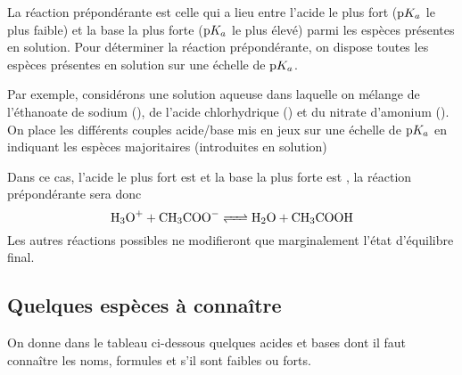 \documentclass{cours}
\begin{document}
La réaction prépondérante est celle qui a lieu entre l'acide le plus fort ($\mathrm{p}K_a$ le plus faible) et la base la plus forte ($\mathrm{p}K_a$  le plus élevé) parmi les espèces présentes en solution. Pour déterminer la réaction prépondérante, on dispose toutes les espèces présentes en solution sur une échelle de $\mathrm{p}K_a$. 

Par exemple, considérons une solution aqueuse dans laquelle on mélange de l'éthanoate de sodium (), de l'acide chlorhydrique () et du nitrate d'amonium (). On place les différents couples acide/base mis en jeux sur une échelle de $\mathrm{p}K_a$ en indiquant les espèces majoritaires (introduites en solution)
\begin{center}
\end{center}

Dans ce cas, l'acide le plus fort est  et la base la plus forte est , la réaction prépondérante sera donc
\begin{equation}
  \ce{H3O+ + CH3COO- <=> H2O + CH3COOH}
\end{equation}
Les autres réactions possibles ne modifieront que marginalement l'état d'équilibre final.
\subsection{Quelques espèces à connaître}%
\label{sub:quelques_couples_a_connaitre}
On donne dans le tableau ci-dessous quelques acides et bases dont il faut connaître les noms, formules et s'il sont faibles ou forts.
\end{document}
